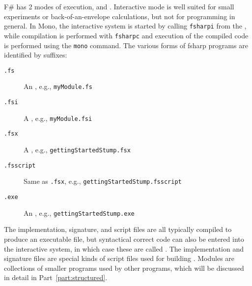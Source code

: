 F\# has 2 modes of execution,  and . Interactive mode is well suited for small experiments or back-of-an-envelope calculations, but not for programming in general. In Mono, the interactive system is started by calling \lstinline[language=console]{fsharpi} from the , while compilation is performed with \lstinline[language=console]{fsharpc} and execution of the compiled code is performed using the \lstinline[language=console]{mono} command. The various forms of fsharp programs are identified by suffixes:
\begin{description}
\item[\texttt{.fs}] An , e.g., \lstinline[language=console]{myModule.fs}
\item[\texttt{.fsi}] A , e.g., \lstinline[language=console]{myModule.fsi}
\item[\texttt{.fsx}] A , e.g., \lstinline[language=console]{gettingStartedStump.fsx}
\item[\texttt{.fsscript}] Same as \lstinline[language=console]{.fsx}, e.g., \lstinline[language=console]{gettingStartedStump.fsscript}
\item[\texttt{.exe}] An , e.g., \lstinline[language=console]{gettingStartedStump.exe}
\end{description}
The implementation, signature, and script files are all typically compiled to produce an executable file, but syntactical correct code can also be entered into the interactive system, in which case these are called . The implementation and signature files are special kinds of script files used for building . Modules are collections of smaller programs used by other programs, which will be discussed in detail in Part~\ref{part:structured}.

